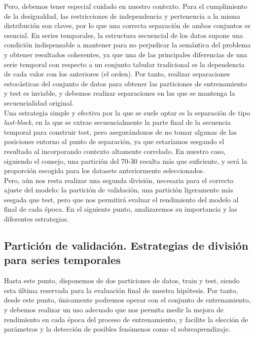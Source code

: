 Pero, debemos tener especial cuidado en nuestro contexto. Para el cumplimiento de la desigualdad, las restricciones de independencia y pertenencia a la misma distribución son claves, por lo que una correcta separación de ambos conjuntos es esencial. En series temporales, la estructura secuencial de los datos supone una condición indispensable a mantener para no perjudicar la semántica del problema y obtener resultados coherentes, ya que una de las principales diferencias de una serie temporal con respecto a un conjunto tabular tradicional es la dependencia de cada valor con los anteriores (el orden). Por tanto, realizar separaciones estocásticas del conjunto de datos para obtener las particiones de entrenamiento y test es inviable, y debemos realizar separaciones en las que se mantenga la secuencialidad original.\\

 Una estrategia simple y efectiva por la que se suele optar es la separación de tipo \textit{last-block}, en la que se extrae secuencialmente la parte final de la secuencia temporal para construir test, pero asegurándonos de no tomar algunas de las posiciones entorno al punto de separación, ya que estaríamos sesgando el resultado al incorporando contexto altamente correlado. En nuestro caso, siguiendo el consejo, una partición del 70-30 resulta más que suficiente, y será la proporción escogida para los datasets anteriormente seleccionados.\\
 
 Pero, aún nos resta realizar una segunda división, necesaria para el correcto ajuste del modelo: la partición de validación, una partición ligeramente más sesgada que test, pero que nos permitirá evaluar el rendimiento del modelo al final de cada época. En el siguiente punto, analizaremos su importancia y las diferentes estrategias.

\subsection{Partición de validación. Estrategias de división para series temporales}

Hasta este punto, disponemos de dos particiones de datos, train y test, siendo esta última reservada para la evaluación final de nuestra hipótesis. Por tanto, desde este punto, únicamente podremos operar con el conjunto de entrenamiento, y debemos realizar un uso adecuado que nos permita medir la mejora de rendimiento en cada época del proceso de entrenamiento, y facilite la elección de parámetros y la detección de posibles fenómenos como el sobreaprendizaje.\\

